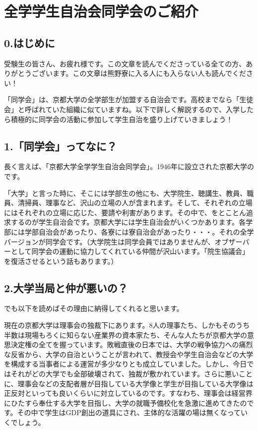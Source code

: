 
\subsecnomaru

\section{全学学生自治会同学会のご紹介}
\label{sec:dogakkai}


\subsection{0.はじめに}
受験生の皆さん、お疲れ様です。この文章を読んでくださっている全ての方、ありがとうございます。この文章は熊野寮に入る人にも入らない人も読んでください！

「同学会」は、京都大学の全学部生が加盟する自治会です。高校までなら「生徒会」と呼ばれていた組織に似ていますね。以下で詳しく解説するので、入学したら積極的に同学会の活動に参加して学生自治を盛り上げていきましょう！

\subsection{1.「同学会」ってなに？}
長く言えば、「京都大学全学学生自治会同学会」。1946年に設立された京都大学のです。

「大学」と言った時に、そこには学部生の他にも、大学院生、聴講生、教員、職員、清掃員、理事など、沢山の立場の人が含まれます。そして、それぞれの立場にはそれぞれの立場に応じた、要請や利害があります。その中で、をとことん追求するのが学生自治会です。京都大学には学生自治会がいくつかあります。各学部には学部自治会があったり、各寮には寮自治会があったり・・・。それの全学バージョンが同学会です。（大学院生は同学会員ではありませんが、オブザーバーとして同学会の運動に協力してくれている仲間が沢山います。「院生協議会」を復活させるという話もあります。）

\subsection{2.大学当局と仲が悪いの？}
でも以下を読めばその理由に納得してくれると思います。

現在の京都大学は理事会の独裁下にあります。8人の理事たち、しかもそのうち半数は現場もろくに知らない産業界の資本家たち、そんな人たちが京都大学の意思決定権の全てを握っています。敗戦直後の日本では、大学の戦争協力への痛烈な反省から、大学の自治ということが言われて、教授会や学生自治会などの大学を構成する当事者による運営が多少なりとも成立していました。しかし、今日ではそれがどの大学でも全部破壊されて、独裁が敷かれています。さらに悪いことに、理事会などの支配者層が目指している大学像と学生が目指している大学像は正反対といっても良いくらいに対立しているのです。すなわち、理事会は経営界にひたすら奉仕する大学を目指し、大学の就職予備校化を急激に進めてきたのです。その中で学生はGDP創出の道具にされ、主体的な活躍の場は無くなっていくでしょう。

